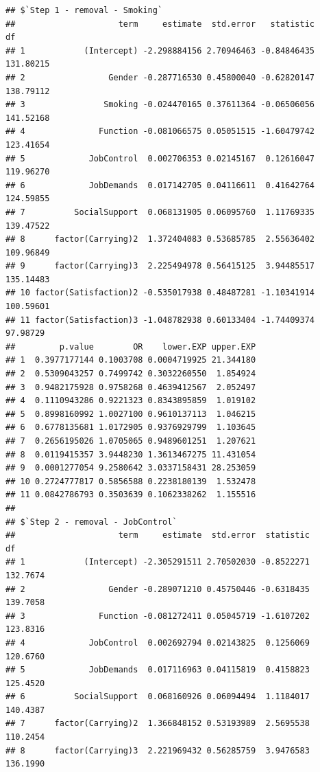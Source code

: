 \documentclass[
]{book}
\newenvironment{Shaded}{\begin{snugshade}}{\end{snugshade}}
\newcommand{\NormalTok}[1]{#1}
\newcommand{\SpecialCharTok}[1]{\textcolor[rgb]{0.00,0.00,0.00}{#1}}
\begin{document}
\begin{Shaded}
\end{Shaded}

\begin{verbatim}
## $`Step 1 - removal - Smoking`
##                     term     estimate  std.error   statistic        df
## 1            (Intercept) -2.298884156 2.70946463 -0.84846435 131.80215
## 2                 Gender -0.287716530 0.45800040 -0.62820147 138.79112
## 3                Smoking -0.024470165 0.37611364 -0.06506056 141.52168
## 4               Function -0.081066575 0.05051515 -1.60479742 123.41654
## 5             JobControl  0.002706353 0.02145167  0.12616047 119.96270
## 6             JobDemands  0.017142705 0.04116611  0.41642764 124.59855
## 7          SocialSupport  0.068131905 0.06095760  1.11769335 139.47522
## 8      factor(Carrying)2  1.372404083 0.53685785  2.55636402 109.96849
## 9      factor(Carrying)3  2.225494978 0.56415125  3.94485517 135.14483
## 10 factor(Satisfaction)2 -0.535017938 0.48487281 -1.10341914 100.59601
## 11 factor(Satisfaction)3 -1.048782938 0.60133404 -1.74409374  97.98729
##         p.value        OR    lower.EXP upper.EXP
## 1  0.3977177144 0.1003708 0.0004719925 21.344180
## 2  0.5309043257 0.7499742 0.3032260550  1.854924
## 3  0.9482175928 0.9758268 0.4639412567  2.052497
## 4  0.1110943286 0.9221323 0.8343895859  1.019102
## 5  0.8998160992 1.0027100 0.9610137113  1.046215
## 6  0.6778135681 1.0172905 0.9376929799  1.103645
## 7  0.2656195026 1.0705065 0.9489601251  1.207621
## 8  0.0119415357 3.9448230 1.3613467275 11.431054
## 9  0.0001277054 9.2580642 3.0337158431 28.253059
## 10 0.2724777817 0.5856588 0.2238180139  1.532478
## 11 0.0842786793 0.3503639 0.1062338262  1.155516
## 
## $`Step 2 - removal - JobControl`
##                     term     estimate  std.error  statistic       df
## 1            (Intercept) -2.305291511 2.70502030 -0.8522271 132.7674
## 2                 Gender -0.289071210 0.45750446 -0.6318435 139.7058
## 3               Function -0.081272411 0.05045719 -1.6107202 123.8316
## 4             JobControl  0.002692794 0.02143825  0.1256069 120.6760
## 5             JobDemands  0.017116963 0.04115819  0.4158823 125.4520
## 6          SocialSupport  0.068160926 0.06094494  1.1184017 140.4387
## 7      factor(Carrying)2  1.366848152 0.53193989  2.5695538 110.2454
## 8      factor(Carrying)3  2.221969432 0.56285759  3.9476583 136.1990

\end{verbatim}
\end{document}
